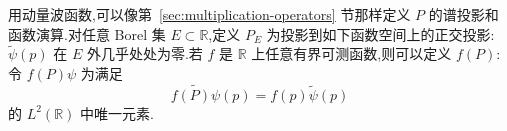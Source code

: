 用动量波函数,可以像第~\ref{sec:multiplication-operators} 节那样定义 \(P\) 的谱投影和函数演算.对任意 Borel 集 \(E\subset\mathbb{R}\),定义 \(P_{E}\) 为投影到如下函数空间上的正交投影:\(\widetilde\psi(p)\) 在 \(E\) 外几乎处处为零.若 \(f\) 是 \(\mathbb{R}\) 上任意有界可测函数,则可以定义 \(f(P)\):令 \(f(P)\psi\) 为满足
\[
\widetilde{f(P)\psi}(p)=f(p)\widetilde\psi(p)
\]
的 \(L^{2}(\mathbb{R})\) 中唯一元素.
